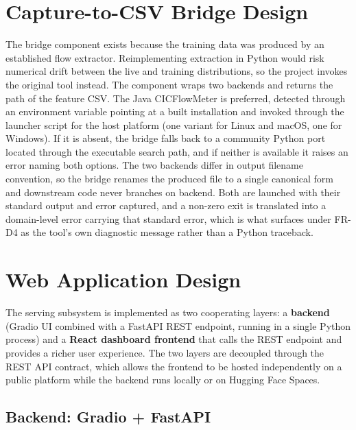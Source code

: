 \section{Capture-to-CSV Bridge Design}
\label{sec:cicflowmeter_design}

\par The bridge component exists because the training data was produced by an established flow extractor. Reimplementing extraction in Python would risk numerical drift between the live and training distributions, so the project invokes the original tool instead. The component wraps two backends and returns the path of the feature CSV. The Java CICFlowMeter is preferred, detected through an environment variable pointing at a built installation and invoked through the launcher script for the host platform (one variant for Linux and macOS, one for Windows). If it is absent, the bridge falls back to a community Python port located through the executable search path, and if neither is available it raises an error naming both options. The two backends differ in output filename convention, so the bridge renames the produced file to a single canonical form and downstream code never branches on backend. Both are launched with their standard output and error captured, and a non-zero exit is translated into a domain-level error carrying that standard error, which is what surfaces under FR-D4 as the tool's own diagnostic message rather than a Python traceback.

\section{Web Application Design}
\label{sec:webapp_design}

\par The serving subsystem is implemented as two cooperating layers: a \textbf{backend} (Gradio UI combined with a FastAPI REST endpoint, running in a single Python process) and a \textbf{React dashboard frontend} that calls the REST endpoint and provides a richer user experience. The two layers are decoupled through the REST API contract, which allows the frontend to be hosted independently on a public platform while the backend runs locally or on Hugging Face Spaces.

\subsection{Backend: Gradio + FastAPI}
\label{subsec:backend_gradio_fastapi}

